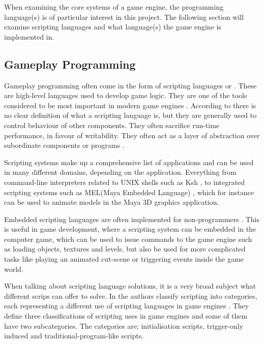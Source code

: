 When examining the core systems of a game engine, the programming language(s) is of particular interest in this project. The following section will examine scripting languages and what language(s) the game engine is implemented in. 

\subsection{Gameplay Programming} \label{sec:gameplay:programming}
Gameplay programming often come in the form of scripting languages or . These are high-level languages used to develop game logic. They are one of the tools considered to be most important in modern game engines \cite{gamasutra:EngineSurvey, 5962102}. According to \cite{5962102} there is no clear definition of what a scripting language is, but they are generally used to control behaviour of other components. They often sacrifice run-time performance, in favour of writability. They often act as a layer of abstraction over subordinate components or programs \cite{5962102}.

Scripting systems make up a comprehensive list of applications and can be used in many different domains, depending on the application. Everything from command-line interpreters related to UNIX shells such as Ksh \cite{korn1994ksh}, to integrated scripting systems such as MEL(Maya Embedded Language) \cite{gould2003complete}, which for instance can be used to animate models in the Maya 3D graphics application.

Embedded scripting languages are often implemented for non-programmers \cite{gamedev:lua}. This is useful in game development, where a scripting system can be embedded in the computer game, which can be used to issue commands to the game engine such as loading objects, textures and levels, but also be used for more complicated tasks like playing an animated cut-scene or triggering events inside the game world. 

When talking about scripting language solutions, it is a very broad subject what different scrips can offer to solve.
In \cite{5962102} the authors classify scripting into categories, each representing a different use of scripting languages in game engines \cite{5962102}. They define three classifications of scripting uses in game engines and some of them have two subcategories. The categories are; initialisation scripts, trigger-only induced and traditional-program-like scripts.

